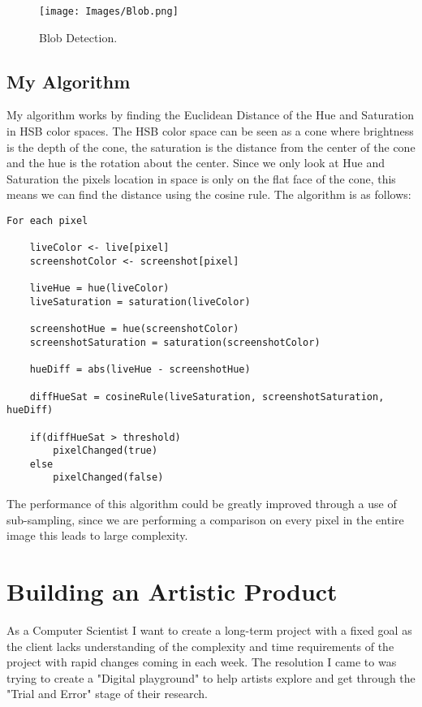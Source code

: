 \documentclass[a4paper]{report}
\begin{document}
\begin{figure}[!ht]
\centering
\texttt{[image: Images/Blob.png]}
\caption{\label{fig:Doughnut} Blob Detection.}
\end{figure}

\subsection{My Algorithm}
My algorithm works by finding the Euclidean Distance of the Hue and Saturation in HSB color spaces. The HSB color space can be seen as a cone where brightness is the depth of the cone, the saturation is the distance from the center of the cone and the hue is the rotation about the center. Since we only look at Hue and Saturation the pixels location in space is only on the flat face of the cone, this means we can find the distance using the cosine rule. The algorithm is as follows:

\begin{lstlisting}
For each pixel

    liveColor <- live[pixel]
    screenshotColor <- screenshot[pixel]
    
    liveHue = hue(liveColor)
    liveSaturation = saturation(liveColor)
    
    screenshotHue = hue(screenshotColor)
    screenshotSaturation = saturation(screenshotColor)
    
    hueDiff = abs(liveHue - screenshotHue)
    
    diffHueSat = cosineRule(liveSaturation, screenshotSaturation, hueDiff)
    
    if(diffHueSat > threshold)
    	pixelChanged(true)
    else
    	pixelChanged(false)
\end{lstlisting}

The performance of this algorithm could be greatly improved through a use of sub-sampling, since we are performing a comparison on every pixel in the entire image this leads to large complexity. 
\section{Building an Artistic Product}
As a Computer Scientist I want to create a long-term project with a fixed goal as the client lacks understanding of the complexity and time requirements of the project with rapid changes coming in each week. The resolution I came to was trying to create a "Digital playground" to help artists explore and get through the "Trial and Error" stage of their research.
\end{document}
